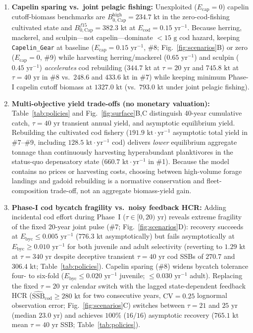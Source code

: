 \documentclass[11pt,letterpaper]{article}
\begin{document}
\begin{enumerate}
  \item \textbf{Capelin sparing vs.\ joint pelagic fishing:} Unexploited ($E_{\mathrm{cap}} = 0$) capelin cutoff-biomass benchmarks are $B_{0,\mathrm{Cap}}^{\mathrm{high}} = 234.7\text{ kt}$ in the zero-cod-fishing cultivated state and $B_{0,\mathrm{Cap}}^{f15} = 382.3\text{ kt}$ at $E_{\mathrm{cod}} = 0.15\text{ yr}^{-1}$. Because herring, mackerel, and sculpin---not capelin---dominate $<15\text{ g}$ cod hazard, keeping \texttt{Capelin\_Gear} at baseline ($E_{\mathrm{cap}} = 0.15\text{ yr}^{-1}$, \#8; Fig.~\ref{fig:scenarios}B) or zero ($E_{\mathrm{cap}} = 0$, \#9) while harvesting herring/mackerel ($0.65\text{ yr}^{-1}$) and sculpin ($0.45\text{ yr}^{-1}$) \emph{accelerates} cod rebuilding ($344.7\text{ kt}$ at $\tau = 20\text{ yr}$ and $745.8\text{ kt}$ at $\tau = 40\text{ yr}$ in \#8 vs.\ $248.6$ and $433.6\text{ kt}$ in \#7) while keeping minimum Phase-I capelin cutoff biomass at $1327.0\text{ kt}$ (vs.\ $793.0\text{ kt}$ under joint pelagic fishing).
  \item \textbf{Multi-objective yield trade-offs (no monetary valuation):} Table~\ref{tab:policies} and Fig.~\ref{fig:surface}B,C distinguish 40-year cumulative catch, $\tau = 40\text{ yr}$ transient annual yield, and asymptotic equilibrium yield. Rebuilding the cultivated cod fishery ($191.9\text{ kt}\cdot\text{yr}^{-1}$ asymptotic total yield in \#7--\#9, including $128.5\text{ kt}\cdot\text{yr}^{-1}$ cod) delivers \emph{lower} equilibrium aggregate tonnage than continuously harvesting hyperabundant planktivores in the status-quo depensatory state ($660.7\text{ kt}\cdot\text{yr}^{-1}$ in \#1). Because the model contains no prices or harvesting costs, choosing between high-volume forage landings and gadoid rebuilding is a normative conservation and fleet-composition trade-off, not an aggregate biomass-yield gain.
  \item \textbf{Phase-I cod bycatch fragility vs.\ noisy feedback HCR:} Adding incidental cod effort during Phase~I ($\tau \in [0, 20)\text{ yr}$) reveals extreme fragility of the fixed 20-year joint pulse (\#7; Fig.~\ref{fig:scenarios}D): recovery succeeds at $E_{\mathrm{byc}} \le 0.005\text{ yr}^{-1}$ ($776.3\text{ kt}$ asymptotically) but fails asymptotically at $E_{\mathrm{byc}} \ge 0.010\text{ yr}^{-1}$ for both juvenile and adult selectivity (reverting to $1.29\text{ kt}$ at $\tau = 340\text{ yr}$ despite deceptive transient $\tau = 40\text{ yr}$ cod SSBs of $270.7$ and $306.4\text{ kt}$; Table~\ref{tab:policies}). Capelin sparing (\#8) widens bycatch tolerance four- to six-fold ($E_{\mathrm{byc}} \le 0.020\text{ yr}^{-1}$ juvenile; $\le 0.030\text{ yr}^{-1}$ adult). Replacing the fixed $\tau = 20\text{ yr}$ calendar switch with the lagged state-dependent feedback HCR ($\widehat{\mathrm{SSB}}_{\mathrm{cod}} \ge 280\text{ kt}$ for two consecutive years, $\mathrm{CV} = 0.25$ lognormal observation error; Fig.~\ref{fig:scenarios}C) switches between $\tau = 21$ and $25\text{ yr}$ (median $23.0\text{ yr}$) and achieves $100\%$ ($16/16$) asymptotic recovery ($765.1\text{ kt}$ mean $\tau = 40\text{ yr}$ SSB; Table~\ref{tab:policies}).
\end{enumerate}
\end{document}
